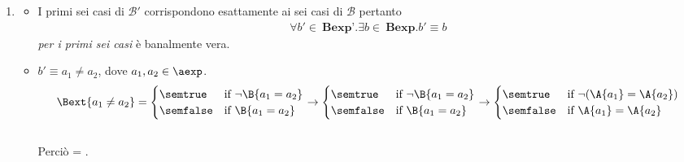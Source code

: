 {\begin{enumerate}[label=(\alph*)]
   =
  \caseFun{\semtrue}
          { \geq {}}
          {\semfalse}
          { \not \geq {}} \\ \\

   = 
  \caseFun{\semtrue}
          { = \semfalse \ \mbox{ or } \
             = \semtrue}
          {\semfalse}
          { = \semtrue \ \mbox{ and } \ 
             = \semfalse} \\ \\

   =
  \caseFun{\semtrue}
          {( = \semtrue \mbox{ and }  = \semtrue)
           \mbox{ or }
           ( = \semfalse \mbox{ and }  = \semfalse)}
          {\semfalse}
          {( = \semtrue \mbox{ or }  = \semfalse)
           \mbox{ and }
           (\B{b_1} = \semfalse \mbox{ or } \B{b_2} = \semtrue)}
          \\ \\

\item
  \begin{itemize}
    \item I primi sei casi di $\mathcal{B'}$ corrispondono esattamente ai sei 
casi di $\mathcal{B}$ pertanto 
      \begin{align*}
        \forall b' \in \ \textbf{Bexp'}.\exists b \in 
        \ \textbf{Bexp}.b' \equiv b
      \end{align*}
      \textit{per i primi sei casi} è banalmente vera.

    \item $b' \equiv a_1 \neq a_2$, dove $a_1, a_2 \in \aexp$. \\ 
      \begin{align*}
        \Bext{a_1 \neq a_2} = 
        \begin{cases} 
          \semtrue & 
          \mbox{if} \ \lnot \B{a_1 = a_2} \\ 
          \semfalse & 
          \mbox{if}  \ \B{a_1 = a_2}\\
        \end{cases}
        \rightarrow
        \begin{cases} 
          \semtrue & 
          \mbox{if} \ \lnot \B{a_1 = a_2} \\ 
          \semfalse & 
          \mbox{if}  \ \B{a_1 = a_2}\\
        \end{cases}
        \rightarrow
        \begin{cases} 
          \semtrue & 
          \mbox{if} \ \lnot (\A{a_1} = \A{a_2}) \\ 
          \semfalse & 
          \mbox{if}  \ \A{a_1} = \A{a_2}\\
        \end{cases} 
      \end{align*} \\
      Perciò  = . \\


\end{itemize}
\end{enumerate}}
